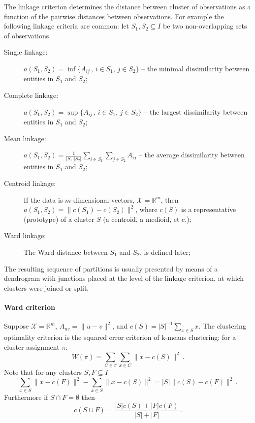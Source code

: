 \documentclass[a4paper]{article}
\newcommand{\Real}{\mathbb{R}}
\begin{document}
The linkage criterion determines the distance between cluster of observations as
a function of the pairwise distances between observations. For example the following
linkage criteria are common: let $S_1, S_2\subseteq I$ be two non-overlapping sets
of observations\begin{description}
    \item[Single linkage:]
        $a(S_1, S_2) = \inf\{A_{ij}\,,\, i\in S_1,\,j\in S_2\}$
        -- the minimal dissimilarity between entities in $S_1$ and $S_2$;
    \item[Complete linkage:]
        $a(S_1, S_2) = \sup\{ A_{ij}\,,\, i\in S_1,\,j\in S_2\}$
        -- the largest dissimilarity between entities in $S_1$ and $S_2$;
    \item[Mean linkage:]
        $a(S_1, S_2) = \frac{1}{|S_1||S_2|} \sum_{i\in S_1}\sum_{j\in S_2} A_{ij}$
        -- the average dissimilarity between entities in $S_1$ and $S_2$;
    \item[Centroid linkage:]
        If the data is $m$-dimensional vectors, $\mathcal{X} = \Real^m$,
        then $a(S_1,S_2) = \|c(S_1) - c(S_2)\|^2$, where $c(S)$ is a representative
        (prototype) of a cluster $S$ (a centroid, a medioid, et c.);
    \item[Ward linkage:]
        The Ward distance between $S_1$ and $S_2$, is defined later;
\end{description}
The resulting sequence of partitions is usually presented by means of a dendrogram
with junctions placed at the level of the linkage criterion, at which clusters were
joined or split.

\paragraph{Ward criterion} %
\label{par:ward_criterion}

Suppose $\mathcal{X} = \Real^m$, $A_{uv} = \|u-v\|^2$, and $c(S) = |S|^{-1} \sum_{x\in S} x$.
The clustering optimality criterion is the squared error criterion of k-means clustering:
for a cluster assignment $\pi$:
$$ W(\pi) = \sum_{C\in \pi} \sum_{x\in C} \|x - c(S)\|^2 \,. $$
Note that for any clusters $S, F\subseteq I$
$$ \sum_{x\in S} \|x - c(F)\|^2 - \sum_{x \in S} \|x - c(S)\|^2
    = |S| \|c(S) - c(F)\|^2 \,. $$
Furthermore if $S \cap F =\emptyset$ then
$$ c(S\cup F) = \frac{|S| c(S) + |F| c(F)}{|S|+|F|} \,. $$
\end{document}
